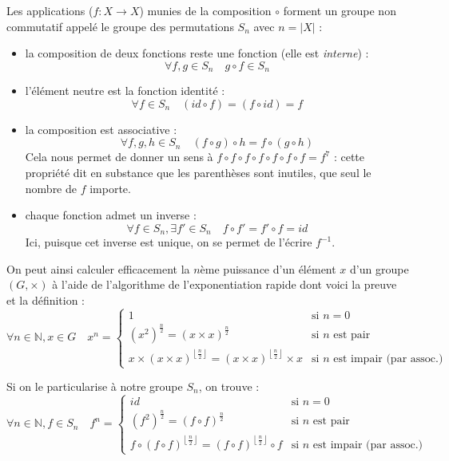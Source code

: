 \documentclass[11pt,a4paper,oneside]{book}
\begin{document}
Les applications ($f:X\rightarrow X$) munies de la composition $\circ$ forment un
groupe non commutatif appelé le groupe des permutations $S_n$ avec $n=|X|$ :
\begin{itemize}
\item la composition de deux fonctions reste une fonction
	(elle est \emph{interne}) :
	\[\forall f,g \in S_n \quad g \circ f \in S_n\]
\item l'élément neutre est la fonction identité :
	\[\forall f\in S_n \quad (id\circ f) = (f\circ id) = f\]
\item la composition est associative :
	\[\forall f, g, h \in S_n \quad (f\circ g)\circ h = f\circ (g\circ h)\]
	Cela nous permet de donner un sens à
	$f\circ f\circ f \circ f\circ f\circ f\circ f=f^7$ : cette propriété
	dit en substance que les parenthèses sont inutiles, que seul le nombre de
	$f$ importe.
\item chaque fonction admet un inverse :
	\[\forall f\in S_n, \exists f'\in S_n \quad f\circ f'=f'\circ f=id\]
	Ici, puisque cet inverse est unique, on se permet de l'écrire $f^{-1}$.
\end{itemize}

On peut ainsi calculer efficacement la $n$ème puissance d'un élément $x$ d'un
groupe $(G, \times)$ à l'aide de l'algorithme de l'exponentiation rapide
dont voici la preuve et la définition :
\[
	\forall n \in \mathbb{N}, x \in G \quad
	x^n = \left\{\begin{array}{ll}
		1 &
			\text{si $n=0$} \\
		\left(x^2\right)^{\frac n2} = \left(x\times x\right)^{\frac n2} &
			\text{si $n$ est pair} \\
		x\times \left(x\times x\right)^{\left\lfloor\frac n2\right\rfloor} =
		\left(x\times x\right)^{\left\lfloor\frac n2\right\rfloor}\times x &
			\text{si $n$ est impair (par assoc.)}
	\end{array}\right.
\]

Si on le particularise à notre groupe $S_n$, on trouve : \[
	\forall n \in \mathbb{N}, f \in S_n \quad
	f^n = \left\{\begin{array}{ll}
		id &
			\text{si $n=0$} \\
		\left(f^2\right)^{\frac n2} = \left(f\circ f\right)^{\frac n2} &
			\text{si $n$ est pair} \\
		f\circ \left(f\circ f\right)^{\left\lfloor\frac n2\right\rfloor} =
		\left(f\circ f\right)^{\left\lfloor\frac n2\right\rfloor}\circ f &
			\text{si $n$ est impair (par assoc.)}
	\end{array}\right.
\]
\end{document}
